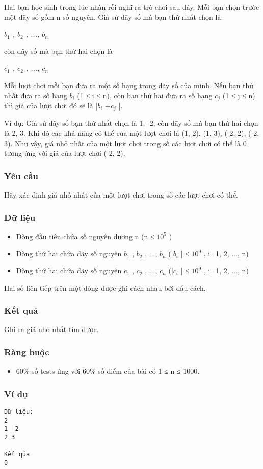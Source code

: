 

Hai bạn học sinh trong lúc nhàn rỗi nghĩ ra trò chơi sau đây. Mỗi bạn chọn trước một dãy số gồm n số nguyên. Giả sử dãy số mà bạn thứ nhất chọn là:

\emph{$b_{1}$ , $b_{2}$ , ..., $b_{n}$}

còn dãy số mà bạn thứ hai chọn là

\emph{$c_{1}$ , $c_{2}$ , ..., $c_{n}$}

Mỗi lượt chơi mỗi bạn đưa ra một số hạng trong dãy số của mình. Nếu bạn thứ nhất đưa ra số hạng $b_{i}$ (1 ≤ i ≤ n), còn bạn thứ hai đưa ra số hạng $c_{j}$ (1 ≤ j ≤ n) thì giá của lượt chơi đó sẽ là |$b_{i}$ +$c_{j}$ |.

Ví dụ: Giả sử dãy số bạn thứ nhất chọn là 1, -2; còn dãy số mà bạn thứ hai chọn là 2, 3. Khi đó các khả năng có thể của một lượt chơi là (1, 2), (1, 3), (-2, 2), (-2, 3). Như vậy, giá nhỏ nhất của một lượt chơi trong số các lượt chơi có thể là 0 tương ứng với giá của lượt chơi (-2, 2).

\subsubsection{Yêu cầu}

Hãy xác định giá nhỏ nhất của một lượt chơi trong số các lượt chơi có thể.

\subsubsection{Dữ liệu}
\begin{itemize}
	\item Dòng đầu tiên chứa số nguyên dương n (n ≤ $10^{5}$ )
	\item Dòng thứ hai chứa dãy số nguyên $b_{1}$ , $b_{2}$ , ..., $b_{n}$ (|$b_{i}$ | ≤ $10^{9}$ , i=1, 2, ..., n)
	\item Dòng thứ hai chứa dãy số nguyên $c_{1}$ , $c_{2}$ , ..., $c_{n}$ (|$c_{i}$ | ≤ $10^{9}$ , i=1, 2, ..., n)
\end{itemize}

Hai số liên tiếp trên một dòng được ghi cách nhau bởi dấu cách.

\subsubsection{Kết quả}

Ghi ra giá nhỏ nhất tìm được.

\subsubsection{Ràng buộc}
\begin{itemize}
	\item 60\% số tests ứng với 60\% số điểm của bài có 1 ≤ n ≤ 1000.
\end{itemize}

\subsubsection{Ví dụ}
\begin{verbatim}
Dữ liệu:
2
1 -2
2 3

Kết qủa
0
\end{verbatim}

